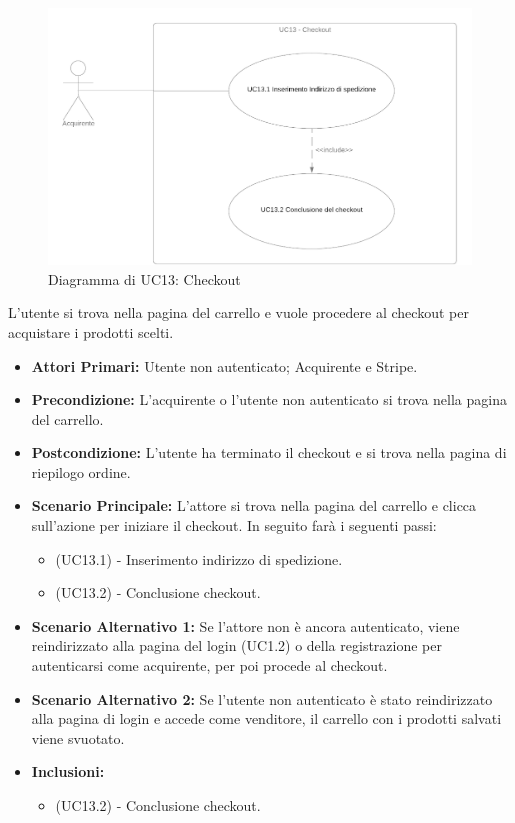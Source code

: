 \begin{figure}[H]
    \centering
    \includegraphics[scale=0.4]{Immagini/DiagrammiUC/UC13Checkout.png}
    \caption{Diagramma di UC13: Checkout} 
    \label{fig:Checkout}
\end{figure}

L'utente si trova nella pagina del carrello e vuole procedere al checkout per acquistare i prodotti scelti.
\begin{itemize}
    \item \textbf{Attori Primari:} Utente non autenticato; Acquirente e Stripe.
    \item \textbf{Precondizione:} L'acquirente o l'utente non autenticato si trova nella pagina del carrello.
    \item \textbf{Postcondizione:} L'utente ha terminato il checkout e si trova nella pagina di riepilogo ordine.
    \item \textbf{Scenario Principale:} L'attore si trova nella pagina del carrello e clicca sull'azione per iniziare il checkout. In seguito farà i seguenti passi:
    \begin{itemize}
        \item (UC13.1) - Inserimento indirizzo di spedizione.
        \item (UC13.2) - Conclusione checkout.
    \end{itemize}
    \item \textbf{Scenario Alternativo 1:} Se l'attore non è ancora autenticato, viene reindirizzato alla pagina del login (UC1.2) o della registrazione per autenticarsi come acquirente, per poi procede al checkout.
    \item \textbf{Scenario Alternativo 2:} Se l'utente non autenticato è stato reindirizzato alla pagina di login e accede come venditore, il carrello con i prodotti salvati viene svuotato.
    \item \textbf{Inclusioni:}
    \begin{itemize}
        \item (UC13.2) - Conclusione checkout.
    \end{itemize}
\end{itemize}


